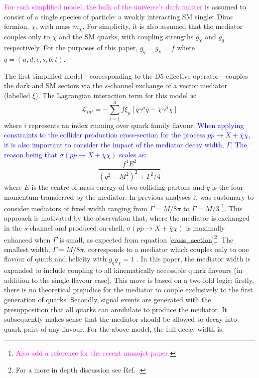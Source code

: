 \begin{flushleft}
\textcolor{magenta}{For each simplified model, the bulk of the universe's dark matter} is assumed to consist of a single species of particle: a weakly interacting SM singlet Dirac fermion, $\chi$, with mass $m_{\chi}$. For simplicity, it is also assumed that the mediator couples only to $\chi$ and the SM quarks, with coupling strengths $g_{\chi}$ and $g_q$ respectively. For the purposes of this paper, $g_q = g_{\chi}=f$ where $q = (u, d, c, s, b, t)$.

\hspace{1cm}The first simplified model - corresponding to the D5 effective operator - couples the dark and SM sectors via the $s$-channel exchange of a vector mediator (labelled $\xi$). The Lagrangian interaction term for this model is:
\begin{equation}
\label{L_int_sV}
\mathcal{L}_{int} = -\sum\limits_{i=1}^{3} f\xi_{\mu} \left[\bar{q}\gamma^{\mu}q - \bar{\chi}\gamma^{\mu}\chi\right]
\end{equation}
where $i$ represents an index running over quark family flavour. \textcolor{blue}{When applying constraints to the collider production cross-section for the process $pp \rightarrow X + \bar{\chi}\chi$, it is also important to consider the impact of the mediator decay width, $\Gamma$. The reason being that $\sigma\left(pp \rightarrow X + \bar{\chi}\chi\right)$ scales as:}
\begin{equation}
\label{cross_section}
\frac{f^{4}E^{2}}{(q^{2} - M^{2})^{2} + \Gamma^{2}/4}
\end{equation}
where $E$ is the centre-of-mass energy of two colliding partons and $q$ is the four-momentum transferred by the mediator. In previous analyses it was customary to consider mediators of fixed width ranging from $\Gamma = M/8\pi$ to $\Gamma = M/3$ \cite{METSig, Fox:2012ee} \footnote{\textcolor{magenta}{Also add a reference for the recent monojet paper.}}. This approach is motivated by the observation that, where the mediator is exchanged in the $s$-channel and produced on-shell, $\sigma\left(pp \rightarrow X + \bar{\chi}\chi\right)$ is maximally enhanced when $\Gamma$ is small, as expected from equation \ref{cross_section}\footnote{For a more in depth discussion see Ref. \cite{METSig}.}. The smallest width, $\Gamma = M/8\pi$, corresponds to a mediator which couples only to one flavour of quark and helicity with $g_{q}g_{\chi} = 1$ \cite{METSig}. In this paper, the mediator width is expanded to include coupling to all kinematically accessible quark flavours (in addition to the single flavour case). This move is based on a two-fold logic: firstly, there is no theoretical prejudice for the mediator to couple exclusively to the first generation of quarks. Secondly, signal events are generated with the presupposition that all quarks can annihilate to produce the mediator. It subsequently makes sense that the mediator should be allowed to decay into quark pairs of any flavour. For the above model, the full decay width is:

\end{flushleft}
